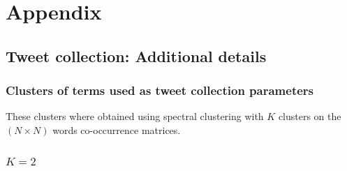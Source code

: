 \hypertarget{ref:Appendix}{\chapter*{Appendix}}
\setcounter{chapter}{1}

\section{Tweet collection: Additional details\label{Sec:OA_Tweet}}
\subsection{Clusters of terms used as tweet collection parameters} \label{Appendix: Clusters}

These clusters where obtained using spectral clustering with $K$ clusters on the $(N \times N) $ words co-occurrence matrices.

\subsection*{$K=2$}


